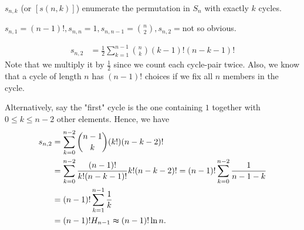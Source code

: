 \begin{definition} \label{def: Stirling number for the first kind}
    \(s_{n, k}\) (or \([s(n, k)]\)) enumerate the permutation in \(S_n\) with exactly \(k\) cycles.   
\end{definition}

\begin{eg}
    \(s_{n, 1} = (n-1)!, s_{n,n} = 1, s_{n, n-1} = \binom{n}{2}, s_{n, 2} =\)not so obvious.
\end{eg}
\begin{explanation}
    \begin{align*}
        s_{n, 2} &= \frac{1}{2}\sum_{k=1}^{n-1} \binom{n}{k}(k-1)!(n-k-1)! 
    \end{align*}
    Note that we multiply it by \(\frac{1}{2}\) since we count each cycle-pair twice. Also, we know that a cycle of length \(n\) has \((n-1)!\) choices if we fix all \(n\) members in the cycle.   
    
    Alternatively, say the "first" cycle is the one containing \(1\) together with \(0 \le k \le n-2\) other elements. Hence, we have 
    \begin{align*}
        s_{n,2} &= \sum_{k=0}^{n-2} \binom{n-1}{k}(k!)(n-k-2)! \\
        &= \sum_{k=0}^{n-2} \frac{(n-1)!}{k!(n-k-1)!}k!(n-k-2)! = (n-1)! \sum_{k=0}^{n-2}\frac{1}{n-1-k} \\
        &= (n-1)! \sum_{k=1}^{n-1} \frac{1}{k} \\
        &= (n-1)! H_{n-1} \thickapprox (n-1)!\ln n.    
    \end{align*}
\end{explanation}

